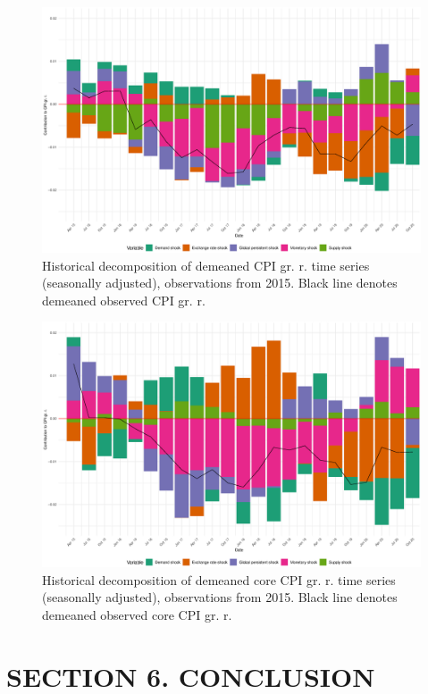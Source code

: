 \documentclass[12pt, a4paper]{extarticle}
\begin{document}
\begin{figure}
	\centering
	\includegraphics[width=0.95\linewidth]{figures/hd_cpi_cut}
	\caption[]{Historical decomposition of demeaned CPI gr. r. time series (seasonally adjusted), observations from 2015. Black line denotes demeaned observed CPI gr. r.}
	\label{fig:hd_cpi_cut}
\end{figure}

\begin{figure}
	\centering
	\includegraphics[width=0.95\linewidth]{figures/hd_core_cpi_cut}
	\caption[]{Historical decomposition of demeaned core CPI gr. r. time series (seasonally adjusted), observations from 2015. Black line denotes demeaned observed core CPI gr. r.}
	\label{fig:hd_core_cpi_cut}
\end{figure}



\clearpage
\section*{SECTION 6. CONCLUSION}
\end{document}
